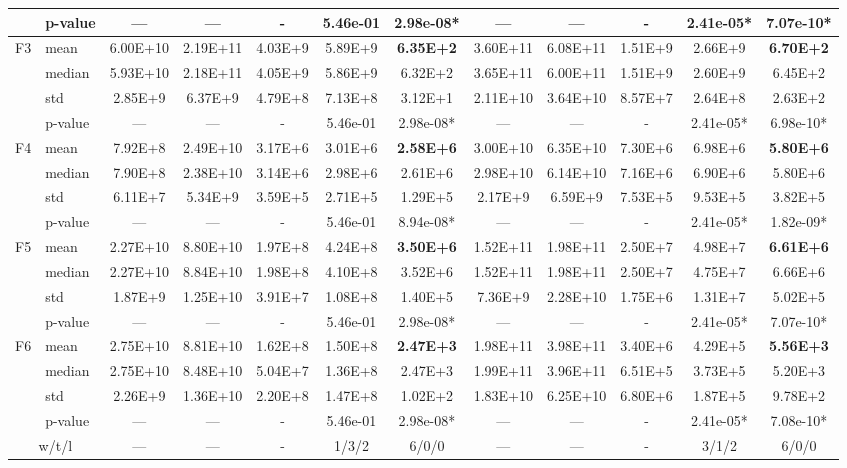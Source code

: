 \documentclass[conference]{IEEEtran}
\newcommand{\bestval}[1]{\cellcolor{bestcellbg}\bfseries #1}
\begin{document}
\begin{table}[!t]
{\begin{tabular}{llccccc|ccccc}
& p-value & --- & --- & - & 5.46e-01 & 2.98e-08* & --- & --- & - & 2.41e-05* & 7.07e-10* \\
\midrule
\multirow{4}{*}{F3}
& mean    & 6.00E+10 & 2.19E+11 & 4.03E+9 & 5.89E+9 & \bestval{6.35E+2} & 3.60E+11 & 6.08E+11 & 1.51E+9 & 2.66E+9 & \bestval{6.70E+2} \\
& median  & 5.93E+10 & 2.18E+11 & 4.05E+9 & 5.86E+9 & 6.32E+2 & 3.65E+11 & 6.00E+11 & 1.51E+9 & 2.60E+9 & 6.45E+2 \\
& std     & 2.85E+9 & 6.37E+9 & 4.79E+8 & 7.13E+8 & 3.12E+1 & 2.11E+10 & 3.64E+10 & 8.57E+7 & 2.64E+8 & 2.63E+2 \\
& p-value & --- & --- & - & 5.46e-01 & 2.98e-08* & --- & --- & - & 2.41e-05* & 6.98e-10* \\
\midrule
\multirow{4}{*}{F4}
& mean    & 7.92E+8 & 2.49E+10 & 3.17E+6 & 3.01E+6 & \bestval{2.58E+6} & 3.00E+10 & 6.35E+10 & 7.30E+6 & 6.98E+6 & \bestval{5.80E+6} \\
& median  & 7.90E+8 & 2.38E+10 & 3.14E+6 & 2.98E+6 & 2.61E+6 & 2.98E+10 & 6.14E+10 & 7.16E+6 & 6.90E+6 & 5.80E+6 \\
& std     & 6.11E+7 & 5.34E+9 & 3.59E+5 & 2.71E+5 & 1.29E+5 & 2.17E+9 & 6.59E+9 & 7.53E+5 & 9.53E+5 & 3.82E+5 \\
& p-value & --- & --- & - & 5.46e-01 & 8.94e-08* & --- & --- & - & 2.41e-05* & 1.82e-09* \\
\midrule
\multirow{4}{*}{F5}
& mean    & 2.27E+10 & 8.80E+10 & 1.97E+8 & 4.24E+8 & \bestval{3.50E+6} & 1.52E+11 & 1.98E+11 & 2.50E+7 & 4.98E+7 & \bestval{6.61E+6} \\
& median  & 2.27E+10 & 8.84E+10 & 1.98E+8 & 4.10E+8 & 3.52E+6 & 1.52E+11 & 1.98E+11 & 2.50E+7 & 4.75E+7 & 6.66E+6 \\
& std     & 1.87E+9 & 1.25E+10 & 3.91E+7 & 1.08E+8 & 1.40E+5 & 7.36E+9 & 2.28E+10 & 1.75E+6 & 1.31E+7 & 5.02E+5 \\
& p-value & --- & --- & - & 5.46e-01 & 2.98e-08* & --- & --- & - & 2.41e-05* & 7.07e-10* \\
\midrule
\multirow{4}{*}{F6}
& mean    & 2.75E+10 & 8.81E+10 & 1.62E+8 & 1.50E+8 & \bestval{2.47E+3} & 1.98E+11 & 3.98E+11 & 3.40E+6 & 4.29E+5 & \bestval{5.56E+3} \\
& median  & 2.75E+10 & 8.48E+10 & 5.04E+7 & 1.36E+8 & 2.47E+3 & 1.99E+11 & 3.96E+11 & 6.51E+5 & 3.73E+5 & 5.20E+3 \\
& std     & 2.26E+9 & 1.36E+10 & 2.20E+8 & 1.47E+8 & 1.02E+2 & 1.83E+10 & 6.25E+10 & 6.80E+6 & 1.87E+5 & 9.78E+2 \\
& p-value & --- & --- & - & 5.46e-01 & 2.98e-08* & --- & --- & - & 2.41e-05* & 7.08e-10* \\
\midrule
\multicolumn{2}{c}{w/t/l} & --- & --- & - & 1/3/2 & 6/0/0 & --- & --- & - & 3/1/2 & 6/0/0 \\
\bottomrule
\end{tabular}
}
\end{table}
\end{document}
